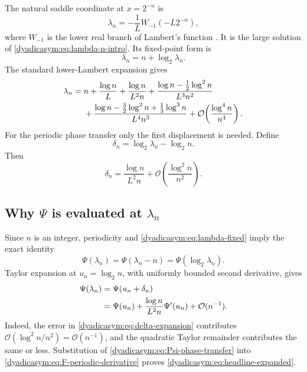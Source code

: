 \documentclass[11pt,oneside]{article}
\theoremstyle{definition}
\theoremstyle{remark}
\newcommand{\bigO}{\mathcal O}
\begin{document}
The natural saddle coordinate at $x=2^{-n}$ is
\begin{equation}
 \lambda_n=-\frac1L W_{-1}(-L2^{-n}),                       \label{dyadicasym:eq:lambda-W}
\end{equation}
where $W_{-1}$ is the lower real branch of Lambert's function
\cite{dyadicasym:corless1996}.  It is the large solution of \eqref{dyadicasym:eq:lambda-n-intro}.  Its fixed-point
form is
\begin{equation}
 \lambda_n=n+\log_2\lambda_n.                               \label{dyadicasym:eq:lambda-fixed}
\end{equation}
The standard lower-Lambert expansion gives
\begin{align}
 \lambda_n={}&n+\frac{\log n}{L}+\frac{\log n}{L^2n}
 +\frac{\log n-\tfrac12\log^2n}{L^3n^2}                    \notag\\
 &+\frac{\log n-\tfrac32\log^2n+\tfrac13\log^3n}{L^4n^3}
 +\bigO\!\left(\frac{\log^4n}{n^4}\right).               \label{dyadicasym:eq:lambda-expansion}
\end{align}
For the periodic phase transfer only the first displacement is needed.  Define
\begin{equation}
 \delta_n=\log_2\lambda_n-\log_2n.                          \label{dyadicasym:eq:delta}
\end{equation}
Then
\begin{equation}
 \delta_n=\frac{\log n}{L^2n}
 +\bigO\!\left(\frac{\log^2n}{n^2}\right).                \label{dyadicasym:eq:delta-expansion}
\end{equation}

\subsection{Why \texorpdfstring{$\Psi$}{Psi} is evaluated at \texorpdfstring{$\lambda_n$}{lambda n}}

Since $n$ is an integer, periodicity and \eqref{dyadicasym:eq:lambda-fixed} imply the exact identity
\begin{equation}
 \Psi(\lambda_n)=\Psi(\lambda_n-n)
 =\Psi(\log_2\lambda_n).                                   \label{dyadicasym:eq:Psi-lambda-exact}
\end{equation}
Taylor expansion at $u_n=\log_2n$, with uniformly bounded second derivative, gives
\begin{align}
 \Psi(\lambda_n)
 &=\Psi(u_n+\delta_n)                                      \notag\\
 &=\Psi(u_n)+\frac{\log n}{L^2n}\Psi'(u_n)
   +\bigO(n^{-1}).                                          \label{dyadicasym:eq:Psi-phase-transfer}
\end{align}
Indeed, the error in \eqref{dyadicasym:eq:delta-expansion} contributes
$\bigO(\log^2n/n^2)=\bigO(n^{-1})$, and the quadratic Taylor remainder contributes the same
or less.  Substitution of \eqref{dyadicasym:eq:Psi-phase-transfer} into
\eqref{dyadicasym:eq:F-periodic-derivative} proves \eqref{dyadicasym:eq:headline-expanded}.
\end{document}
